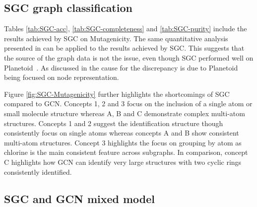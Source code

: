 \subsection{SGC graph classification}
\label{SGC-graph}



Tables \ref{tab:SGC-acc}, \ref{tab:SGC-completeness} and \ref{tab:SGC-purity} include the results achieved by SGC on Mutagenicity.
The same quantitative analysis presented in  can be applied to the results achieved by SGC.
This suggests that the source of the graph data is not the issue, even though SGC performed well on Planetoid~\cite{Fey/Lenssen/2019}.
As discussed in  the cause for the discrepancy is due to Planetoid~\cite{Fey/Lenssen/2019} being focused on node representation.

Figure \ref{fig:SGC-Mutagenicity} further highlights the shortcomings of SGC compared to GCN.
Concepts 1, 2 and 3 focus on the inclusion of a single atom or small molecule structure whereas A, B and C demonstrate complex multi-atom structures.
Concepts 1 and 2 suggest the identification structure though consistently focus on single atoms whereas concepts A and B show consistent multi-atom structures.
Concept 3 highlights the focus on grouping by atom as chlorine is the main consistent feature across subgraphs.
In comparison, concept C highlights how GCN can identify very large structures with two cyclic rings consistently identified.

\subsection{SGC and GCN mixed model}
\label{sec:SGCN-eval}

